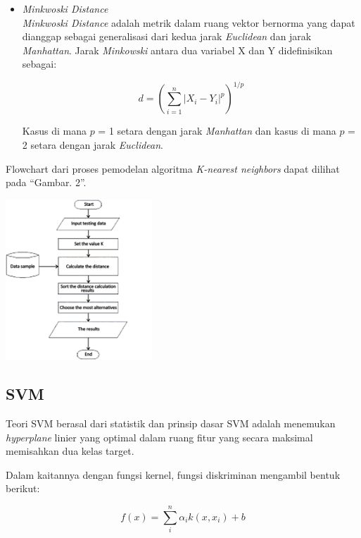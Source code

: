 \documentclass[conference]{IEEEtran}
\begin{document}
\begin{itemize}
\item \emph{Minkwoski Distance}\\
\emph{Minkwoski Distance} adalah metrik dalam ruang vektor bernorma yang dapat dianggap sebagai generalisasi dari kedua jarak \emph{Euclidean} dan jarak \emph{Manhattan}. Jarak \emph{Minkowski} antara dua variabel X dan Y didefinisikan sebagai:

\begin{equation}
d = (\sum^{n}_{i=1} | X_i-Y_i |^p)^{1/p}
\label{eq3}
\end{equation}

Kasus di mana $p$ = 1 setara dengan jarak \emph{Manhattan} dan kasus di mana $p$ = 2 setara dengan jarak \emph{Euclidean}.

\end{itemize}

Flowchart dari proses pemodelan algoritma \emph{K-nearest neighbors} dapat dilihat pada ``Gambar. 2''\cite{lubis2020optimization}.\vspace{6pt}

\begin{minipage}{\linewidth}
\centerline{\includegraphics[width=55mm]{Gambar/Gbr002.jpg}}
\label{fig2}
\end{minipage}

\subsection{SVM}

Teori SVM berasal dari statistik dan prinsip dasar SVM adalah menemukan \emph{hyperplane} linier yang optimal dalam ruang fitur yang secara maksimal memisahkan dua kelas target\cite{hasan}.

Dalam kaitannya dengan fungsi kernel, fungsi diskriminan mengambil bentuk berikut:

\begin{equation}
f(x) = \sum^{n}_i \alpha_ik(x,x_i)+b
\label{eq4}
\end{equation}
\end{document}
